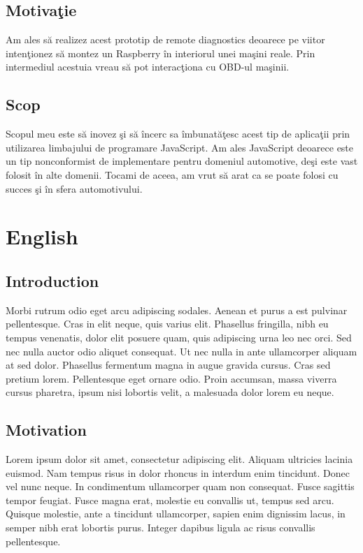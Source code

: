 \subsection{Motiva\c tie}

Am ales s\u a realizez acest prototip de remote diagnostics deoarece pe viitor inten\c tionez s\u a montez un Raspberry \^ in interiorul unei ma\c sini reale. Prin intermediul acestuia vreau s\u a pot interac\c tiona cu OBD-ul ma\c sinii.


\subsection{Scop}

Scopul meu este s\u a inovez \c si s\u a \^ incerc sa \^ imbunat\u a\c tesc acest tip de aplica\c tii prin utilizarea limbajului de programare JavaScript. 
Am ales JavaScript deoarece este un tip nonconformist de implementare pentru domeniul automotive, de\c si este vast folosit \^ in alte domenii. Tocami de aceea, am  vrut s\u a arat ca se poate folosi cu succes \c si \^ in sfera automotivului.
\section{English}

\subsection{Introduction}
Morbi rutrum odio eget arcu adipiscing sodales. Aenean et purus a est pulvinar pellentesque. Cras in elit neque, quis varius elit. Phasellus fringilla, nibh eu tempus venenatis, dolor elit posuere quam, quis adipiscing urna leo nec orci. Sed nec nulla auctor odio aliquet consequat. Ut nec nulla in ante ullamcorper aliquam at sed dolor. Phasellus fermentum magna in augue gravida cursus. Cras sed pretium lorem. Pellentesque eget ornare odio. Proin accumsan, massa viverra cursus pharetra, ipsum nisi lobortis velit, a malesuada dolor lorem eu neque.

\subsection{Motivation}

Lorem ipsum dolor sit amet, consectetur adipiscing elit. Aliquam ultricies lacinia euismod. Nam tempus risus in dolor rhoncus in interdum enim tincidunt. Donec vel nunc neque. In condimentum ullamcorper quam non consequat. Fusce sagittis tempor feugiat. Fusce magna erat, molestie eu convallis ut, tempus sed arcu. Quisque molestie, ante a tincidunt ullamcorper, sapien enim dignissim lacus, in semper nibh erat lobortis purus. Integer dapibus ligula ac risus convallis pellentesque.

